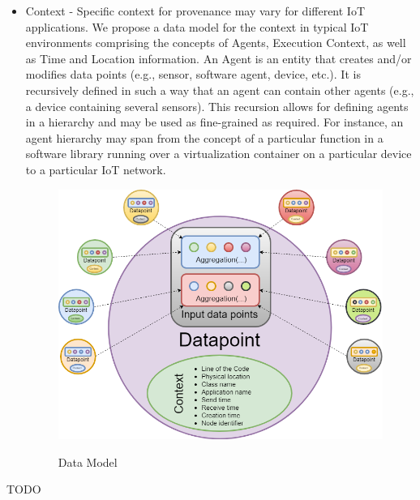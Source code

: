 \begin{itemize}
	\begin{itemize}			
			\item Example: 
\begin{lstlisting}			
[{
    "average": [   // Contribution type
        "5a81c07800031ddaf123",
        "5a81c09300031d341fab"
    ]
}]		
\end{lstlisting}
	\end{itemize}
	\item Context - Specific context for provenance may vary for different IoT applications. We propose a data model for the context in typical IoT environments comprising the concepts of Agents, Execution Context, as well as Time and Location information. An Agent is an entity that creates and/or modifies data points (e.g., sensor, software agent, device, etc.). It is recursively defined in such a way that an agent can contain other agents (e.g., a device containing several sensors). This recursion allows for defining agents in a hierarchy and may be used as fine-grained as required. For instance, an agent hierarchy may span from the concept of a particular function in a software library running over a virtualization container on a particular device to a particular IoT network.
		
\begin{figure}[h]
\centering
\includegraphics[width=\linewidth]{figures/dataModelforIDP.png}\\
\caption{Data Model}
\label{dataModel}
\end{figure}
\end{itemize}
TODO